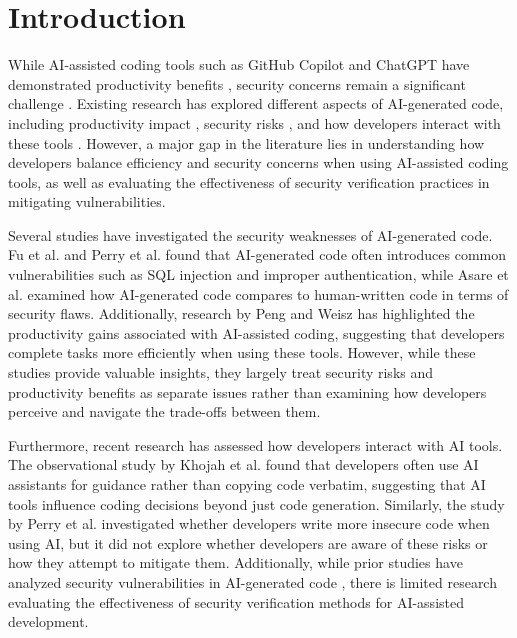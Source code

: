 \section{Introduction}

While AI-assisted coding tools such as GitHub Copilot and ChatGPT have demonstrated productivity benefits \cite{peng2023impact, weisz2025examining}, security concerns remain a significant challenge \cite{fu2025security, perry2023}. Existing research has explored different aspects of AI-generated code, including productivity impact \cite{peng2023impact, weisz2025examining}, security risks \cite{fu2025security, perry2023}, and how developers interact with these tools \cite{ranim2024}. However, a major gap in the literature lies in understanding how developers balance efficiency and security concerns when using AI-assisted coding tools, as well as evaluating the effectiveness of security verification practices in mitigating vulnerabilities.

Several studies have investigated the security weaknesses of AI-generated code. Fu et al. \cite{fu2025security} and Perry et al. \cite{perry2023} found that AI-generated code often introduces common vulnerabilities such as SQL injection and improper authentication, while Asare et al. \cite{asare2024} examined how AI-generated code compares to human-written code in terms of security flaws. Additionally, research by Peng and Weisz \cite{peng2023impact, weisz2025examining} has highlighted the productivity gains associated with AI-assisted coding, suggesting that developers complete tasks more efficiently when using these tools. However, while these studies provide valuable insights, they largely treat security risks and productivity benefits as separate issues rather than examining how developers perceive and navigate the trade-offs between them.

Furthermore, recent research has assessed how developers interact with AI tools. The observational study by Khojah et al. \cite{ranim2024} found that developers often use AI assistants for guidance rather than copying code verbatim, suggesting that AI tools influence coding decisions beyond just code generation. Similarly, the study by Perry et al. \cite{perry2023} investigated whether developers write more insecure code when using AI, but it did not explore whether developers are aware of these risks or how they attempt to mitigate them. Additionally, while prior studies have analyzed security vulnerabilities in AI-generated code \cite{fu2025security, perry2023, asare2024}, there is limited research evaluating the effectiveness of security verification methods for AI-assisted development.


